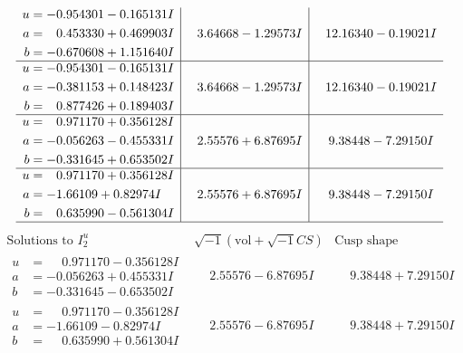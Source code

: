 \documentclass[1p]{elsarticle_modified}
\theoremstyle{definition}
\newcommand{\I}{\sqrt{-1}}
\begin{document}
$$\begin{array}{c|c|c}
\begin{aligned}
u &= -0.954301 - 0.165131 I \\
a &= \phantom{-}0.453330 + 0.469903 I \\
b &= -0.670608 + 1.151640 I\end{aligned}
 & \phantom{-}3.64668 - 1.29573 I & \phantom{-}12.16340 - 0.19021 I \\ \hline\begin{aligned}
u &= -0.954301 - 0.165131 I \\
a &= -0.381153 + 0.148423 I \\
b &= \phantom{-}0.877426 + 0.189403 I\end{aligned}
 & \phantom{-}3.64668 - 1.29573 I & \phantom{-}12.16340 - 0.19021 I \\ \hline\begin{aligned}
u &= \phantom{-}0.971170 + 0.356128 I \\
a &= -0.056263 - 0.455331 I \\
b &= -0.331645 + 0.653502 I\end{aligned}
 & \phantom{-}2.55576 + 6.87695 I & \phantom{-}9.38448 - 7.29150 I \\ \hline\begin{aligned}
u &= \phantom{-}0.971170 + 0.356128 I \\
a &= -1.66109 + 0.82974 I \\
b &= \phantom{-}0.635990 - 0.561304 I\end{aligned}
 & \phantom{-}2.55576 + 6.87695 I & \phantom{-}9.38448 - 7.29150 I\\
 \hline 
 \end{array}$$\newpage$$\begin{array}{c|c|c}  
\text{Solutions to }I^u_{2}& \I (\text{vol} + \sqrt{-1}CS) & \text{Cusp shape}\\
 \hline 
\begin{aligned}
u &= \phantom{-}0.971170 - 0.356128 I \\
a &= -0.056263 + 0.455331 I \\
b &= -0.331645 - 0.653502 I\end{aligned}
 & \phantom{-}2.55576 - 6.87695 I & \phantom{-}9.38448 + 7.29150 I \\ \hline\begin{aligned}
u &= \phantom{-}0.971170 - 0.356128 I \\
a &= -1.66109 - 0.82974 I \\
b &= \phantom{-}0.635990 + 0.561304 I\end{aligned}
 & \phantom{-}2.55576 - 6.87695 I & \phantom{-}9.38448 + 7.29150 I \\ \hline\begin{aligned}

\end{aligned}
\end{array}$$
\end{document}
